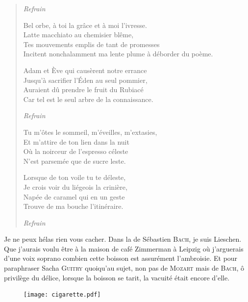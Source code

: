 \begin{verse}
  \emph{Refrain}  %

  Bel orbe, à toi la grâce et à moi l’ivresse.\\ 
  Latte macchiato au chemisier blême,\\ 
  Tes mouvements emplis de tant de promesses\\ 
  Incitent nonchalamment ma lente plume à déborder du poème. 

  Adam et Ève qui causèrent notre errance\\ 
  Jusqu’à sacrifier l’Éden au seul pommier,\\ 
  Auraient dû prendre le fruit du Rubiacé\\ 
  Car tel est le seul arbre de la connaissance. 

  \emph{Refrain}  %

  Tu m’ôtes le sommeil, m’éveilles, m’extasies,\\ 
  Et m’attire de ton lien dans la nuit\\ 
  Où la noirceur de l’espresso céleste\\ 
  N’est parsemée que de sucre leste. 

  Lorsque de ton voile tu te déleste,\\ 
  Je crois voir du liégeois la crinière,\\ 
  Napée de caramel qui en un geste\\ 
  Trouve de ma bouche l’itinéraire. 

  \emph{Refrain}
\end{verse}


\begin{prose}
  Je ne peux hélas rien vous cacher. Dans la  de Sébastien \textsc{Bach}, je suis Lieschen. Que j’aurais voulu être à la maison de café Zimmerman à Leipzig où j’arguerais d’une voix soprano combien  cette boisson est assurément l’ambroisie. Et pour paraphraser Sacha \textsc{Guitry} quoiqu’au sujet, non pas de \textsc{Mozart} mais de \textsc{Bach}, ô privilège du délice, lorsque la boisson se tarit, la vacuité était encore d’elle.
\end{prose}

\begin{figure}[h]
  \centering
  \texttt{[image: cigarette.pdf]}
  \captionsetup{labelformat=empty}
  \caption[Idéotexte de la ]{}
\end{figure}

